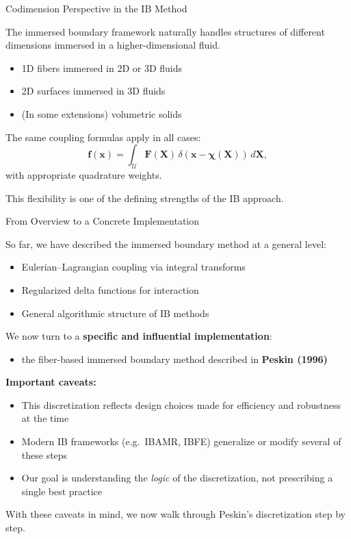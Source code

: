 \documentclass{beamer}
\begin{document}
\begin{frame}{Codimension Perspective in the IB Method}
\small

The immersed boundary framework naturally handles structures of
different dimensions immersed in a higher-dimensional fluid.

\medskip
\begin{itemize}
    \item 1D fibers immersed in 2D or 3D fluids
    \item 2D surfaces immersed in 3D fluids
    \item (In some extensions) volumetric solids
\end{itemize}

\medskip
The same coupling formulas apply in all cases:
\[
\mathbf{f}(\mathbf{x})
=
\int_{\mathcal{U}}
\mathbf{F}(\mathbf{X})\,
\delta(\mathbf{x}-\boldsymbol{\chi}(\mathbf{X}))\,d\mathbf{X},
\]
with appropriate quadrature weights.

\medskip
This flexibility is one of the defining strengths of the IB approach.

\end{frame}



\begin{frame}{From Overview to a Concrete Implementation}
\small

So far, we have described the immersed boundary method at a general level:
\begin{itemize}
    \item Eulerian–Lagrangian coupling via integral transforms
    \item Regularized delta functions for interaction
    \item General algorithmic structure of IB methods
\end{itemize}

\medskip

We now turn to a \textbf{specific and influential implementation}:
\begin{itemize}
    \item the fiber-based immersed boundary method described in \textbf{Peskin (1996)}
\end{itemize}

\medskip

\textbf{Important caveats:}
\begin{itemize}
    \item This discretization reflects design choices made for efficiency and robustness at the time
    \item Modern IB frameworks (e.g.\ IBAMR, IBFE) generalize or modify several of these steps
    \item Our goal is understanding the \emph{logic} of the discretization, not prescribing a single best practice
\end{itemize}

\medskip

With these caveats in mind, we now walk through Peskin’s discretization step by step.

\end{frame}
\end{document}
